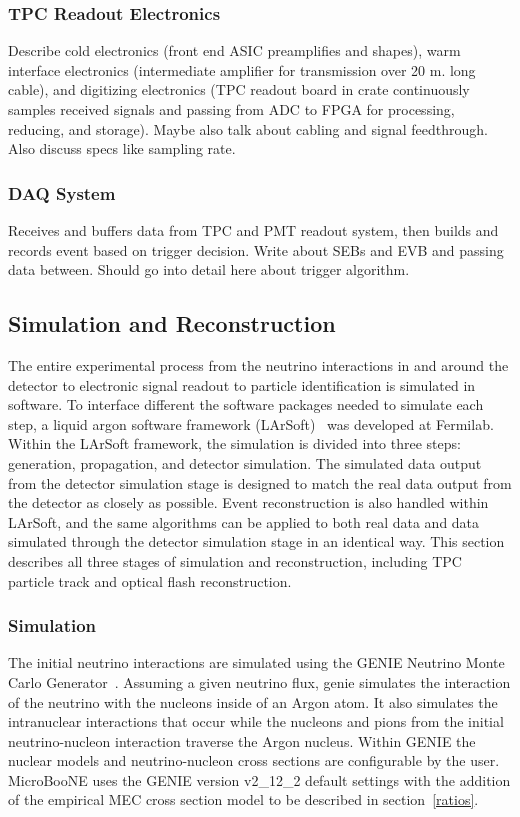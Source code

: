   \subsubsection{TPC Readout Electronics}
    Describe cold electronics (front end ASIC preamplifies and shapes), warm
    interface electronics (intermediate amplifier for transmission over 20 m.
    long cable), and digitizing electronics (TPC readout board in crate
    continuously samples received signals and passing from ADC to FPGA for
    processing, reducing, and storage). Maybe also talk about cabling and
    signal feedthrough. Also discuss specs like sampling rate.
  \subsubsection{DAQ System}
    Receives and buffers data from TPC and PMT readout system, then builds and
    records event based on trigger decision. Write about SEBs and EVB and
    passing data between. Should go into detail here about trigger algorithm.

\subsection{Simulation and Reconstruction}\label{reco}
  The entire experimental process from the neutrino interactions in and around
  the detector to electronic signal readout to particle identification is
  simulated in software. To interface different the software packages needed to
  simulate each step, a liquid argon software framework (LArSoft)~\cite{larsoft}
  was developed at Fermilab. Within the LArSoft framework, the simulation is
  divided into three steps: generation, propagation, and detector simulation.
  The simulated data output from the detector simulation stage is designed to
  match the real data output from the detector as closely as possible. Event
  reconstruction is also handled within LArSoft, and the same algorithms can be
  applied to both real data and data simulated through the detector simulation
  stage in an identical way. This section describes all three stages of
  simulation and reconstruction, including TPC particle track and optical flash
  reconstruction.
  \subsubsection{Simulation}
    The initial neutrino interactions are simulated using the GENIE Neutrino
    Monte Carlo Generator~\cite{Andreopoulos:2009rq,Andreopoulos:2015wxa}.
    Assuming a given neutrino flux, genie simulates the interaction of the
    neutrino with the nucleons inside of an Argon atom. It also simulates the
    intranuclear interactions that occur while the nucleons and pions from the
    initial neutrino-nucleon interaction traverse the Argon nucleus.  Within
    GENIE the nuclear models and neutrino-nucleon cross sections are
    configurable by the user.  MicroBooNE uses the GENIE version v2\_12\_2
    default settings with the addition of the empirical MEC cross section model
    to be described in section~\ref{ratios}.

